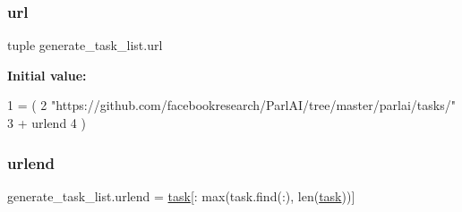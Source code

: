 \subsubsection{\texorpdfstring{url}{url}}
{\footnotesize\ttfamily tuple generate\+\_\+task\+\_\+list.\+url}

{\bfseries Initial value\+:}
\begin{DoxyCode}
1 =  (
2             \textcolor{stringliteral}{"https://github.com/facebookresearch/ParlAI/tree/master/parlai/tasks/"}
3             + urlend
4         )
\end{DoxyCode}
\mbox{\label{namespacegenerate__task__list_a32a1426d61e9e5475d58bdb9db0d22ab}} 
\subsubsection{\texorpdfstring{urlend}{urlend}}
{\footnotesize\ttfamily generate\+\_\+task\+\_\+list.\+urlend = \hyperlink{namespacegenerate__task__list_a6a85e730374a68f9195f2e0e4fc09a9a}{task}\mbox{[}\+: max(task.\+find(\textquotesingle{}\+:\textquotesingle{}), len(\hyperlink{namespacegenerate__task__list_a6a85e730374a68f9195f2e0e4fc09a9a}{task}))\mbox{]}}

